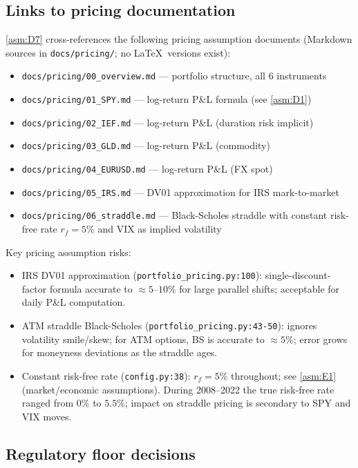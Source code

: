 \documentclass[11pt,a4paper]{article}
\newcommand{\code}[1]{\texttt{#1}}
\begin{document}
\subsection{Links to pricing documentation}

\cref{asm:D7} cross-references the following pricing assumption documents
(Markdown sources in \code{docs/pricing/}; no \LaTeX\ versions exist):

\begin{itemize}
  \item \code{docs/pricing/00\_overview.md} --- portfolio structure, all 6 instruments
  \item \code{docs/pricing/01\_SPY.md} --- log-return P\&L formula (see \cref{asm:D1})
  \item \code{docs/pricing/02\_IEF.md} --- log-return P\&L (duration risk implicit)
  \item \code{docs/pricing/03\_GLD.md} --- log-return P\&L (commodity)
  \item \code{docs/pricing/04\_EURUSD.md} --- log-return P\&L (FX spot)
  \item \code{docs/pricing/05\_IRS.md} --- DV01 approximation for IRS mark-to-market
  \item \code{docs/pricing/06\_straddle.md} --- Black-Scholes straddle with constant
    risk-free rate $r_f = 5\%$ and VIX as implied volatility
\end{itemize}

Key pricing assumption risks:
\begin{itemize}
  \item IRS DV01 approximation (\code{portfolio\_pricing.py:100}): single-discount-factor
    formula accurate to $\approx 5$--$10\%$ for large parallel shifts; acceptable for
    daily P\&L computation.
  \item ATM straddle Black-Scholes (\code{portfolio\_pricing.py:43-50}): ignores
    volatility smile/skew; for ATM options, BS is accurate to $\approx 5\%$; error
    grows for moneyness deviations as the straddle ages.
  \item Constant risk-free rate (\code{config.py:38}): $r_f = 5\%$ throughout;
    see \cref{asm:E1} (market/economic assumptions). During 2008--2022 the true
    risk-free rate ranged from $0\%$ to $5.5\%$; impact on straddle pricing is
    secondary to SPY and VIX moves.
\end{itemize}

\subsection{Regulatory floor decisions}
\end{document}
